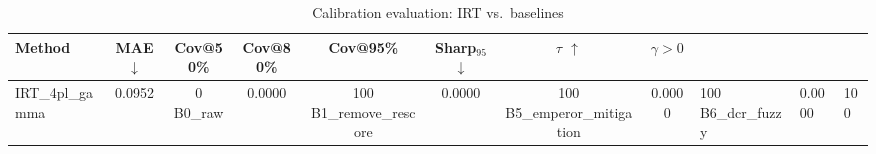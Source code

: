 \begin{table}[t]
\centering
\small
\caption{Calibration evaluation: IRT vs.\ baselines}
\label{tab:calibration-eval}
\begin{tabular}{lccccccc}
\toprule
Method & MAE $\downarrow$ & Cov@50\% & Cov@80\% & Cov@95\% & Sharp$_{95}$ $\downarrow$ & $\tau$ $\uparrow$ & $\gamma > 0$ \\
\midrule
IRT\_4pl\_gamma & 0.0952 & 0%
B0\_raw & 0.0000 & 100%
B1\_remove\_rescore & 0.0000 & 100%
B5\_emperor\_mitigation & 0.0000 & 100%
B6\_dcr\_fuzzy & 0.0000 & 100%
\bottomrule
\end{tabular}
\end{table}